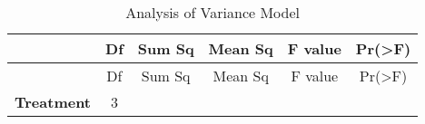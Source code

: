 \documentclass[]{article}
\begin{document}
\begin{longtable}[]{@{}cccccc@{}}
\caption{Analysis of Variance Model}\tabularnewline
\toprule
\begin{minipage}[b]{0.19\columnwidth}\centering\strut
~\strut
\end{minipage} & \begin{minipage}[b]{0.06\columnwidth}\centering\strut
Df\strut
\end{minipage} & \begin{minipage}[b]{0.10\columnwidth}\centering\strut
Sum Sq\strut
\end{minipage} & \begin{minipage}[b]{0.12\columnwidth}\centering\strut
Mean Sq\strut
\end{minipage} & \begin{minipage}[b]{0.12\columnwidth}\centering\strut
F value\strut
\end{minipage} & \begin{minipage}[b]{0.12\columnwidth}\centering\strut
Pr(\textgreater{}F)\strut
\end{minipage}\tabularnewline
\midrule
\endfirsthead
\toprule
\begin{minipage}[b]{0.19\columnwidth}\centering\strut
~\strut
\end{minipage} & \begin{minipage}[b]{0.06\columnwidth}\centering\strut
Df\strut
\end{minipage} & \begin{minipage}[b]{0.10\columnwidth}\centering\strut
Sum Sq\strut
\end{minipage} & \begin{minipage}[b]{0.12\columnwidth}\centering\strut
Mean Sq\strut
\end{minipage} & \begin{minipage}[b]{0.12\columnwidth}\centering\strut
F value\strut
\end{minipage} & \begin{minipage}[b]{0.12\columnwidth}\centering\strut
Pr(\textgreater{}F)\strut
\end{minipage}\tabularnewline
\midrule
\endhead
\begin{minipage}[t]{0.19\columnwidth}\centering\strut
\textbf{Treatment}\strut
\end{minipage} & \begin{minipage}[t]{0.06\columnwidth}\centering\strut
3\strut
\end{minipage} & \begin{minipage}[t]{0.10\columnwidth}\centering\strut

\end{minipage}
\end{longtable}
\end{document}
